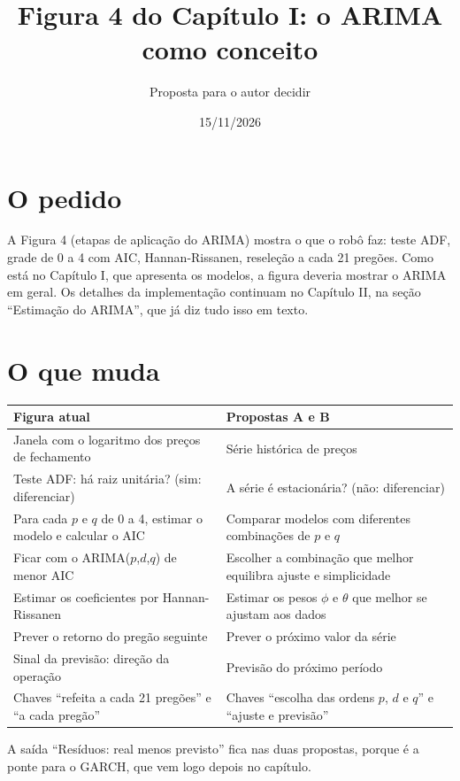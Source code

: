 \documentclass[11pt,a4paper]{article}
\title{Figura 4 do Capítulo I: o ARIMA como conceito}
\author{Proposta para o autor decidir}
\date{15/11/2026}
\begin{document}
\maketitle

\section*{O pedido}
A Figura 4 (etapas de aplicação do ARIMA) mostra o que o robô faz: teste ADF, grade de 0 a 4 com AIC,
Hannan-Rissanen, reseleção a cada 21 pregões. Como está no Capítulo I, que apresenta os modelos, a figura
deveria mostrar o ARIMA em geral. Os detalhes da implementação continuam no Capítulo II, na seção
``Estimação do ARIMA'', que já diz tudo isso em texto.

\section*{O que muda}
\begin{center}\small
\begin{tabular}{>{\raggedright}p{} >{\raggedright\arraybackslash}p{}}
\toprule
Figura atual & Propostas A e B \\
\midrule
Janela com o logaritmo dos preços de fechamento & Série histórica de preços \\
Teste ADF: há raiz unitária? (sim: diferenciar) & A série é estacionária? (não: diferenciar) \\
Para cada $p$ e $q$ de 0 a 4, estimar o modelo e calcular o AIC & Comparar modelos com diferentes combinações de $p$ e $q$ \\
Ficar com o ARIMA($p$,$d$,$q$) de menor AIC & Escolher a combinação que melhor equilibra ajuste e simplicidade \\
Estimar os coeficientes por Hannan-Rissanen & Estimar os pesos $\phi$ e $\theta$ que melhor se ajustam aos dados \\
Prever o retorno do pregão seguinte & Prever o próximo valor da série \\
Sinal da previsão: direção da operação & Previsão do próximo período \\
Chaves ``refeita a cada 21 pregões'' e ``a cada pregão'' & Chaves ``escolha das ordens $p$, $d$ e $q$'' e ``ajuste e previsão'' \\
\bottomrule
\end{tabular}
\end{center}

A saída ``Resíduos: real menos previsto'' fica nas duas propostas, porque é a ponte para o GARCH, que vem logo
depois no capítulo.
\end{document}
